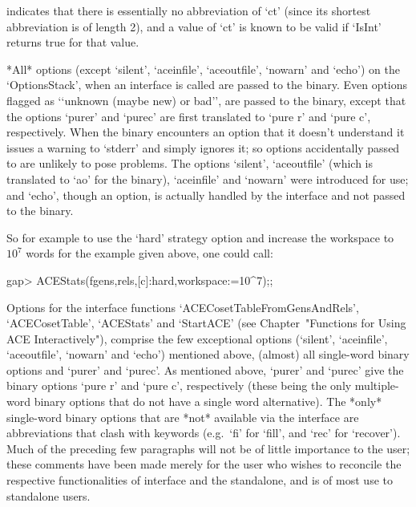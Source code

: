 indicates that there is essentially no abbreviation of `ct' (since its
shortest abbreviation is of length 2),  and a value of  `ct' is  known
to be valid if `IsInt' returns true for that value.

*All* options (except `silent',  `aceinfile',  `aceoutfile',  `nowarn'
and `echo') on the `OptionsStack', when an {\ACE} interface is  called
are passed to the {\ACE} binary. Even options flagged as \lq{}`unknown
(maybe new) or bad'', are passed to the {\ACE} binary, except that the
options `purer' and `purec' are first translated to `pure r' and `pure
c', respectively. When the {\ACE} binary encounters an option that  it
doesn't understand it issues a warning to `stderr' and simply  ignores
it; so options accidentally passed to  {\ACE}  are  unlikely  to  pose
problems. The options `silent', `aceoutfile' (which is  translated  to
`ao' for the binary), `aceinfile' and  `nowarn'  were  introduced  for
{\GAP} use; and `echo', though an {\ACE} option, is  actually  handled
by the {\ACE} interface and not passed to the binary.

So  for example to  use the  `hard' strategy  option and  increase the
workspace to $10^7$ words for the example given above, one could call:

\begintt
gap> ACEStats(fgens,rels,[c]:hard,workspace:=10^7);;
\endtt

Options      for      the       {\ACE}       interface       functions
`ACECosetTableFromGensAndRels',   `ACECosetTable',   `ACEStats'    and
`StartACE' (see  Chapter~"Functions  for  Using  ACE  Interactively"),
comprise  the  few   exceptional   options   (`silent',   `aceinfile',
`aceoutfile', `nowarn'  and  `echo')  mentioned  above,  (almost)  all
single-word  {\ACE}  binary  options  and  `purer'  and  `purec'.   As
mentioned above, `purer' and `purec' give the  {\ACE}  binary  options
`pure  r'  and  `pure  c',  respectively   (these   being   the   only
multiple-word {\ACE} binary options that do not  have  a  single  word
alternative). The *only* single-word {\ACE} binary  options  that  are
*not* available via the {\ACE} interface are abbreviations that  clash
with {\GAP} keywords (e.g.~`fi' for `fill', and `rec' for  `recover').
Much of the preceding few paragraphs will not be of little  importance
to the {\GAP} user; these comments have been made merely for the  user
who wishes to  reconcile  the  respective  functionalities  of  {\ACE}
interface and the {\ACE} standalone, and is of most use to  standalone
users.


